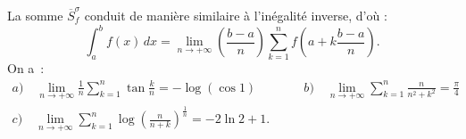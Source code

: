 {{La somme $\overline{S}_{f}^{\sigma}$ conduit de manière similaire à l'inégalité inverse,
d'o\`u :
\begin{equation*}
\int_{a}^{b} f(x)\,dx =
\lim_{n\rightarrow+\infty}\left(\frac{b-a}{n}\right)
\sum_{k=1}^{n}f\left(a+k\frac{b-a}{n}\right).
\end{equation*}
On a~:
\begin{eqnarray*}
a)\quad\lim_{n\rightarrow+\infty}
\frac{1}{n}\sum_{k=1}^{n}\tan\frac{k}{n} = -\log(\cos 1)
\quad\quad\quad &
b)\quad\lim_{n\rightarrow+\infty}\sum_{k=1}^{n}\frac{n}{n^2+k^2} =
\frac{\pi}{4} \quad\quad\quad\\
c)\quad\lim_{n\rightarrow+\infty}\sum_{k=1}^{n}\log\left(\frac{n}{n+k}\right)^{\frac{1}{n}}
= -2\ln 2 + 1. &
\end{eqnarray*}}
}